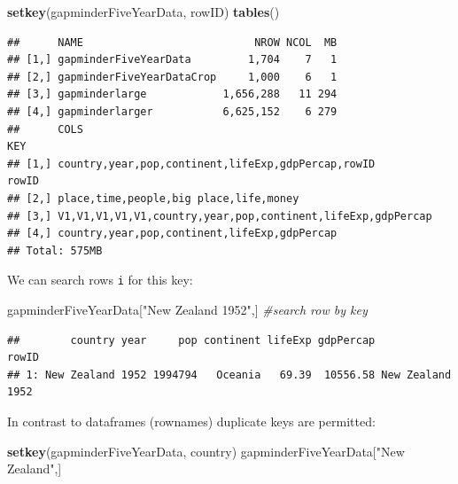 \documentclass[]{article}
\newenvironment{Shaded}{\begin{snugshade}}{\end{snugshade}}
\newcommand{\KeywordTok}[1]{\textcolor[rgb]{0.13,0.29,0.53}{\textbf{{#1}}}}
\newcommand{\StringTok}[1]{\textcolor[rgb]{0.31,0.60,0.02}{{#1}}}
\newcommand{\CommentTok}[1]{\textcolor[rgb]{0.56,0.35,0.01}{\textit{{#1}}}}
\newcommand{\NormalTok}[1]{{#1}}
\begin{document}
\begin{Shaded}
\begin{Highlighting}[]
\KeywordTok{setkey}\NormalTok{(gapminderFiveYearData, rowID)}
\KeywordTok{tables}\NormalTok{()}
\end{Highlighting}
\end{Shaded}

\begin{verbatim}
##      NAME                           NROW NCOL  MB
## [1,] gapminderFiveYearData         1,704    7   1
## [2,] gapminderFiveYearDataCrop     1,000    6   1
## [3,] gapminderlarge            1,656,288   11 294
## [4,] gapminderlarger           6,625,152    6 279
##      COLS                                                        KEY  
## [1,] country,year,pop,continent,lifeExp,gdpPercap,rowID          rowID
## [2,] place,time,people,big place,life,money                           
## [3,] V1,V1,V1,V1,V1,country,year,pop,continent,lifeExp,gdpPercap      
## [4,] country,year,pop,continent,lifeExp,gdpPercap                     
## Total: 575MB
\end{verbatim}

We can search rows \texttt{i} for this key:

\begin{Shaded}
\begin{Highlighting}[]
\NormalTok{gapminderFiveYearData[}\StringTok{"New Zealand 1952"}\NormalTok{,] }\CommentTok{#search row by key}
\end{Highlighting}
\end{Shaded}

\begin{verbatim}
##        country year     pop continent lifeExp gdpPercap            rowID
## 1: New Zealand 1952 1994794   Oceania   69.39  10556.58 New Zealand 1952
\end{verbatim}

In contrast to dataframes (rownames) duplicate keys are permitted:

\begin{Shaded}
\begin{Highlighting}[]
\KeywordTok{setkey}\NormalTok{(gapminderFiveYearData, country)}
\NormalTok{gapminderFiveYearData[}\StringTok{"New Zealand"}\NormalTok{,]}
\end{Highlighting}
\end{Shaded}
\end{document}
